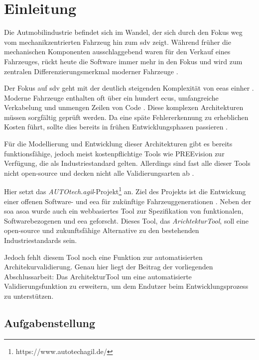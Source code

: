 
\chapter{Einleitung}
\label{ch:introduction}
Die Autmobilindustrie befindet sich im Wandel, der sich durch den Fokus weg vom mechanikzentrierten Fahrzeug hin zum \gls{sdv} zeigt. Während früher die mechanischen Komponenten ausschlaggebend waren für den Verkauf eines Fahrzeuges, rückt heute die Software immer mehr in den Fokus und wird zum zentralen Differenzierungsmerkmal moderner Fahrzeuge \cite{Cha21}\cite{zhao2022}.

Der Fokus auf \gls{sdv} geht mit der deutlich steigenden Komplexität von \glspl{eea} einher \cite{Cha21}\cite{Pancik2018}. Moderne Fahrzeuge enthalten oft über ein hundert \glspl{ecu}, umfangreiche Verkabelung und unmengen Zeilen von Code . Diese komplexen Architekturen müssen sorgfältig geprüft werden. Da eine späte Fehlererkennung zu erheblichen Kosten führt, sollte dies bereits in frühen Entwicklungsphasen passieren \cite{Cha21}.

Für die Modellierung und Entwicklung dieser Architekturen gibt es bereits funktionsfähige, jedoch meist kostenpflichtige Tools wie PREEvision zur Verfügung, die als Industriestandard gelten. Allerdings sind fast alle dieser Tools nicht open-source und decken nicht alle Validierungsarten ab \cite{askaripoor2022architecture}\cite{schauffele2016architectural}.

Hier setzt das \textit{AUTOtech.agil}-Projekt\footnote{https://www.autotechagil.de/} an. Ziel des Projekts ist die Entwickung einer offenen Software- und \gls{eea} für zukünftige Fahrzeuggenerationen \cite{autotechagil2024}\cite{vanKempen2023}. Neben der \gls{soa} \gls{asoa} wurde auch ein webbasiertes Tool zur Spezifikation von funktionalen, Softwarebezogenen und \gls{eea} geforscht. Dieses Tool, das \textit{ArichtekturTool},  soll eine open-source und zukunftsfähige Alternative zu den bestehenden Industriestandards sein.

Jedoch fehlt diesem Tool noch eine Funktion zur automatisierten Architekurvalidierung. Genau hier liegt der Beitrag der vorliegenden Abschlussarbeit: Das ArchitekturTool um eine automatisierte Validierungsfunktion zu erweitern, um dem Endutzer beim Entwicklungsprozess zu unterstützen.
\section{Aufgabenstellung}
\label{sect:aufgabenstellung}

